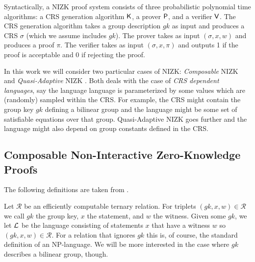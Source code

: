 Syntactically, a NIZK proof system consists of three probabilistic polynomial time algorithms: a CRS
generation algorithm $\mathsf{K}$, a prover $\mathsf{P}$, and a verifier $\mathsf{V}$.
The CRS generation algorithm takes a group description $gk$ as input and produces a CRS $\sigma$ (which we assume includes $gk$). The prover takes as input $(\sigma, x, w)$ and produces a proof $\pi$. The verifier takes as input $(\sigma, x, \pi)$ and outputs 1 if the proof is acceptable and 0 if rejecting the proof.

In this work we will consider two particular cases of NIZK: \emph{Composable} NIZK \cite{EC:GroSah08} and  \emph{Quasi-Adaptive} NIZK \cite{AC:JutRoy13}. Both deals with the case of \emph{CRS dependent languages}, say the language language is parameterized by some values which are (randomly) sampled within the CRS. For example, the CRS might contain the group key $gk$ defining a bilinear group and the language might be some set of satisfiable equations over that group. Quasi-Adaptive NIZK goes further and the language might also depend on group constants defined in the CRS.
 
\subsection{Composable Non-Interactive Zero-Knowledge Proofs}
The following definitions are taken from \cite{SIAMJC:GroSah12}.

\begin{definition} Let $\mathcal{R}$ be an efficiently computable ternary relation.
For triplets $(gk, x, w)\in \mathcal{R}$ we call $gk$ the group key, $x$ the statement, and $w$ the witness.
Given some $gk$, we let $\mathcal{L}$ be the language consisting of statements $x$ that have a
witness $w$ so $(gk, x, w) \in \mathcal{R}$. For a relation that ignores $gk$ this is, of course, the
standard definition of an NP-language. We will be more interested in the case where
$gk$ describes a bilinear group, though.
\end{definition}

